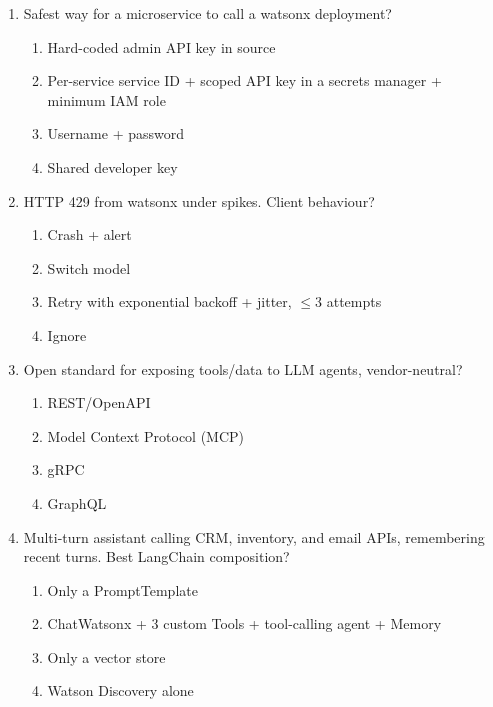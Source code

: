 \begin{enumerate}[leftmargin=*]
\item Safest way for a microservice to call a watsonx deployment?
\begin{enumerate}[label=\Alph*.]
  \item Hard-coded admin API key in source
  \item Per-service service ID + scoped API key in a secrets manager + minimum IAM role
  \item Username + password \item Shared developer key
\end{enumerate}

\item HTTP 429 from watsonx under spikes. Client behaviour?
\begin{enumerate}[label=\Alph*.]
  \item Crash + alert \item Switch model
  \item Retry with exponential backoff + jitter, $\leq$3 attempts \item Ignore
\end{enumerate}

\item Open standard for exposing tools/data to LLM agents, vendor-neutral?
\begin{enumerate}[label=\Alph*.]
  \item REST/OpenAPI \item Model Context Protocol (MCP)
  \item gRPC \item GraphQL
\end{enumerate}

\item Multi-turn assistant calling CRM, inventory, and email APIs, remembering recent turns. Best LangChain composition?
\begin{enumerate}[label=\Alph*.]
  \item Only a PromptTemplate \item ChatWatsonx + 3 custom Tools + tool-calling agent + Memory
  \item Only a vector store \item Watson Discovery alone
\end{enumerate}

\end{enumerate}

\cleardoublepage
